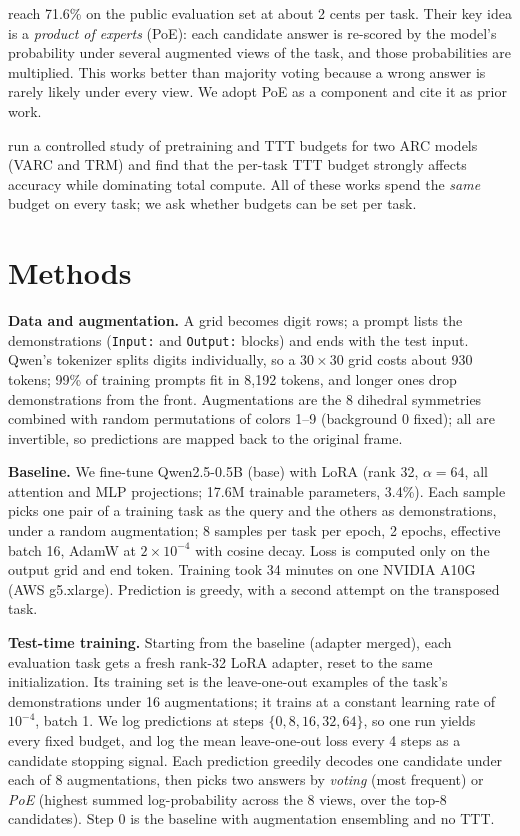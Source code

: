\documentclass{article}
\begin{document}
\textbf{\textcite{franzen2025product}} reach 71.6\% on the public evaluation set at about 2 cents per task. Their key idea is a \emph{product of experts} (PoE): each candidate answer is re-scored by the model's probability under several augmented views of the task, and those probabilities are multiplied. This works better than majority voting because a wrong answer is rarely likely under every view. We adopt PoE as a component and cite it as prior work.

\textbf{\textcite{deliege2026trainingbudgets}} run a controlled study of pretraining and TTT budgets for two ARC models (VARC and TRM) and find that the per-task TTT budget strongly affects accuracy while dominating total compute. All of these works spend the \emph{same} budget on every task; we ask whether budgets can be set per task.

\section{Methods}

\textbf{Data and augmentation.} A grid becomes digit rows; a prompt lists the demonstrations (\texttt{Input:} and \texttt{Output:} blocks) and ends with the test input. Qwen's tokenizer splits digits individually, so a $30\times30$ grid costs about 930 tokens; 99\% of training prompts fit in 8,192 tokens, and longer ones drop demonstrations from the front. Augmentations are the 8 dihedral symmetries combined with random permutations of colors 1--9 (background 0 fixed); all are invertible, so predictions are mapped back to the original frame.

\textbf{Baseline.} We fine-tune Qwen2.5-0.5B (base) with LoRA (rank 32, $\alpha=64$, all attention and MLP projections; 17.6M trainable parameters, 3.4\%). Each sample picks one pair of a training task as the query and the others as demonstrations, under a random augmentation; 8 samples per task per epoch, 2 epochs, effective batch 16, AdamW at $2\times10^{-4}$ with cosine decay. Loss is computed only on the output grid and end token. Training took 34 minutes on one NVIDIA A10G (AWS g5.xlarge). Prediction is greedy, with a second attempt on the transposed task.

\textbf{Test-time training.} Starting from the baseline (adapter merged), each evaluation task gets a fresh rank-32 LoRA adapter, reset to the same initialization. Its training set is the leave-one-out examples of the task's demonstrations under 16 augmentations; it trains at a constant learning rate of $10^{-4}$, batch 1. We log predictions at steps $\{0, 8, 16, 32, 64\}$, so one run yields every fixed budget, and log the mean leave-one-out loss every 4 steps as a candidate stopping signal. Each prediction greedily decodes one candidate under each of 8 augmentations, then picks two answers by \emph{voting} (most frequent) or \emph{PoE} (highest summed log-probability across the 8 views, over the top-8 candidates). Step 0 is the baseline with augmentation ensembling and no TTT.
\end{document}
